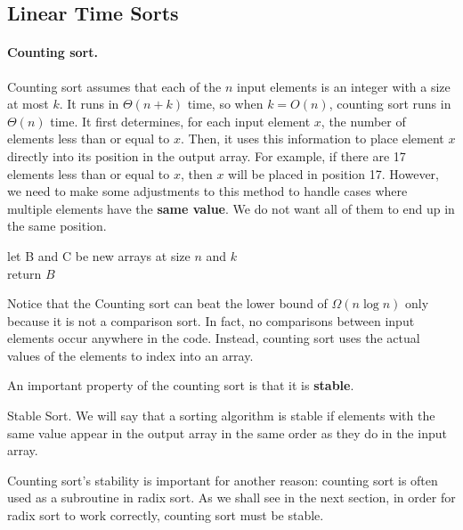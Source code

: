 \subsection{Linear Time Sorts}
\paragraph{ Counting sort.}
Counting sort assumes that each of the $n$ input elements is an integer with a size at most $k$. It runs in $\Theta(n + k)$ time, so when $k = O(n)$, counting sort runs in $\Theta(n)$ time. It first determines, for each input element $x$, the number of elements less than or equal to $x$. Then, it uses this information to place element $x$ directly into its position in the output array. For example, if there are 17 elements less than or equal to $x$, then $x$ will be placed in position 17. However, we need to make some adjustments to this method to handle cases where multiple elements have the \textbf{same value}. We do not want all of them to end up in the same position.

%
  \begin{algorithm}
  	let B and C be new arrays at size $n$ and $k$ \\ 
	  return $B$
\caption{Counting-sort$(A, n, k)$}
  \end{algorithm}
%

Notice that the Counting sort can beat the lower bound of $\Omega\left(n \log n\right)$ only because it is not a comparison sort. In fact, no comparisons between input elements occur anywhere in the code. Instead, counting sort uses the actual values of the elements to index into an array.

An important property of the counting sort is that it is \textbf{stable}.

\begin{defbox}{Stable Sort.}
 We will say that a sorting algorithm is stable if elements with the same value appear in the output array in the same order as they do in the input array. \end{defbox}

Counting sort's stability is important for another reason: counting sort is often used as a subroutine in radix sort. As we shall see in the next section, in order for radix sort to work correctly, counting sort must be stable.


